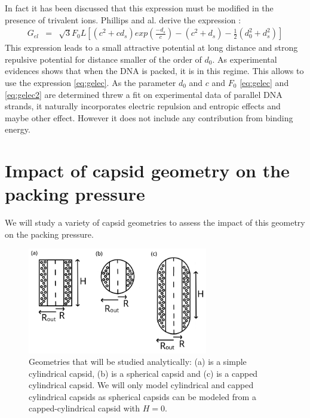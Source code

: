 \documentclass{article}
\begin{document}
In fact it has been discussed that this expression must be modified in the presence of trivalent ions. Phillips and al. derive the expression \cite{phillips2005}:
\begin{eqnarray}
    G_{el} &=& \sqrt{3} F_0 L \left[ \left( c^2 + cd_s \right) exp \left( \frac{- d_s}{c} \right) - \left( c^2 + d_s \right) - \frac{1}{2} \left( d_0^2 + d_s^2 \right) \right] \label{eq:gelec2}
\end{eqnarray}
This expression leads to a small attractive potential at long distance and strong repulsive potential for distance smaller of the order of $d_0$. As experimental evidences shows that when the DNA is packed, it is in this regime. This allows to use the expression \ref{eq:gelec}. As the parameter $d_0$ and $c$ and $F_0$ \ref{eq:gelec} and \ref{eq:gelec2} are determined threw a fit on experimental data of parallel DNA strands, it naturally incorporates electric repulsion and entropic effects and maybe other effect. However it does not include any contribution from binding energy.


\section{Impact of capsid geometry on the packing pressure}

We will study a variety of capsid geometries to assess the impact of this geometry on the packing pressure.


\begin{figure}[H]
    \centering
    \includegraphics[width=0.7\textwidth]{analitical_geometries.png}
    \caption{Geometries that will be studied analytically: (a) is a simple cylindrical capsid, (b) is a spherical capsid and (c) is a capped cylindrical capsid. We will only model cylindrical and capped cylindrical capsids as spherical capsids can be modeled from a capped-cylindrical capsid with $H=0$.}
    \label{fig:enter-label}
\end{figure}
\end{document}
